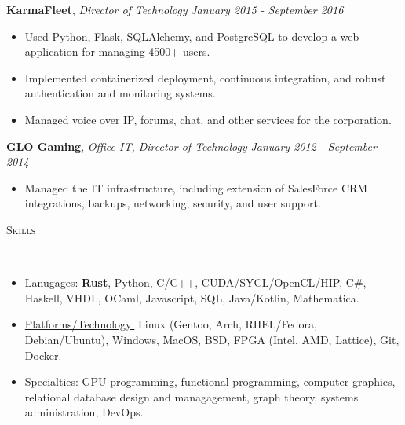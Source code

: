 \documentclass[8pt]{article}
\newenvironment{changemargin}[2]{%
  \begin{list}{}{%
    \setlength{\topsep}{0pt}%
    \setlength{\leftmargin}{#1}%
    \setlength{\rightmargin}{#2}%
    \setlength{\listparindent}{\parindent}%
    \setlength{\itemindent}{\parindent}%
    \setlength{\parsep}{\parskip}%
  }%
  \item[]}{\end{list}
}
\newcommand{\lineover}{
	\begin{changemargin}{-0.05in}{-0.05in}
		\vspace*{-8pt}
		\hrulefill \\
		\vspace*{-2pt}
	\end{changemargin}
}
\newcommand{\header}[1]{
	\begin{changemargin}{-0.5in}{-0.5in}
		\scshape{#1}\\
  	\lineover
	\end{changemargin}
}
\newenvironment{body} {
	\vspace*{-16pt}
	\begin{changemargin}{-0.25in}{-0.5in}
  }	
	{\end{changemargin}
}
\begin{document}
\begin{body}
	\textbf{KarmaFleet}, \emph{Director of Technology} \hfill \emph{January 2015 - September 2016}\\
	\vspace*{-4pt}
	\begin{itemize} \itemsep -0pt %
		\item Used Python, Flask, SQLAlchemy, and PostgreSQL to develop a web application for managing 4500+ users.
		\item Implemented containerized deployment, continuous integration, and robust authentication and monitoring systems.
		\item Managed voice over IP, forums, chat, and other services for the corporation. 
	\end{itemize}
	\vspace*{-4pt}

	\textbf{GLO Gaming}, \emph{Office IT, Director of Technology} \hfill \emph{January 2012 - September 2014}\\
	\vspace*{-4pt}
	\begin{itemize} \itemsep -0pt %
		\item Managed the IT infrastructure, including extension of SalesForce CRM integrations, backups, networking, security, and user support. 
	\end{itemize}
	\vspace*{-4pt}

	\smallskip
	\vspace*{-9pt}
	\smallskip
\end{body}


\smallskip

\header{Skills}
\smallskip
\begin{body}
	\vspace{14pt}
	\begin{itemize} \itemsep -0pt

		\item \uline{Lanugages:} \textbf{Rust}, Python, C/C++, CUDA/SYCL/OpenCL/HIP, C\#, Haskell, VHDL, OCaml, Javascript, SQL, Java/Kotlin, Mathematica.

		\item \uline{Platforms/Technology:} Linux (Gentoo, Arch, RHEL/Fedora,
		Debian/Ubuntu), Windows, MacOS,
		      BSD, FPGA (Intel, AMD, Lattice), Git, Docker.
		\item \uline{Specialties:} GPU programming, functional programming, computer graphics, relational database design and managagement, graph theory, systems administration, DevOps.
	\end{itemize}
\end{body}
\end{document}

